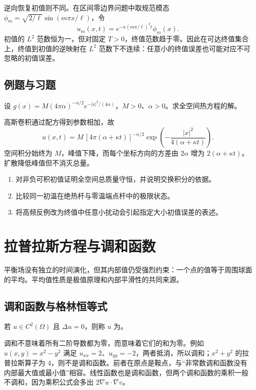 \documentclass[UTF8,12pt,a4paper,fontset=fandol]{ctexbook}
\begin{document}
逆向恢复初值则不同。在区间零边界问题中取规范模态 $\phi_m=\sqrt{2/\ell}\sin(m\pi x/\ell)$，令
\[
 u_m(x,t)=e^{-\kappa(m\pi/\ell)^2t}\phi_m(x).
\]
初值的 $L^2$ 范数恒为一，但对固定 $T>0$，终值范数趋于零。因此在可达终值集合上，终值到初值的逆映射在 $L^2$ 范数下不连续：任意小的终值误差也可能对应不可忽略的初值误差。

\section{例题与习题}
\begin{example}
设 $g(x)=M(4\pi\alpha)^{-n/2}e^{-|x|^2/(4\alpha)}$，$M>0$、$\alpha>0$。求全空间热方程的解。
\end{example}
\begin{solve}
高斯卷积通过配方得到参数相加，故
\[
 u(x,t)=M\,[4\pi(\alpha+\kappa t)]^{-n/2}
 \exp\left(-\frac{|x|^2}{4(\alpha+\kappa t)}\right).
\]
空间积分始终为 $M$，峰值下降，而每个坐标方向的方差由 $2\alpha$ 增为 $2(\alpha+\kappa t)$。扩散降低峰值但不消灭总量。
\end{solve}
\begin{enumerate}
 \item 对非负可积初值证明全空间总质量守恒，并说明交换积分的依据。
 \item 比较同一初温在绝热杆与零温端点杆中的极限状态。
 \item 将高频反例改为终值中任意小扰动会引起指定大小初值误差的表述。
\end{enumerate}

\chapter{拉普拉斯方程与调和函数}
\label{chap:harmonic}

平衡场没有独立的时间演化，但其内部值仍受强烈约束：一个点的值等于周围球面的平均。平均值性质是极值原理和内部平滑性的共同来源。

\section{调和函数与格林恒等式}
\begin{definition}
若 $u\in C^2(\Omega)$ 且 $\Delta u=0$，则称 $u$ 为。
\end{definition}
调和不意味着所有二阶导数都为零，而意味着它们的和为零。例如 $u(x,y)=x^2-y^2$ 满足 $u_{xx}=2$、$u_{yy}=-2$，两者抵消，所以调和；$x^2+y^2$ 的拉普拉斯算子为 $4$，则不是调和函数。前者在原点是鞍点，与“非常数调和函数没有内部最大值或最小值”相容。线性函数也是调和函数，但两个调和函数的乘积一般不调和，因为乘积公式会多出 $2\nabla u\cdot\nabla v$。
\end{document}
